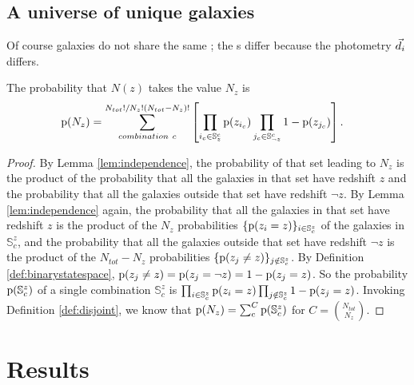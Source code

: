 \subsection{A universe of unique galaxies}

Of course galaxies do not share the same \pzpdf; the \pzpdf s differ because the photometry $\vec{d}_{i}$ differs.
\begin{lemma}\label{lem:unique}
	The probability that $N(z)$ takes the value $N_{z}$ is 
	\begin{align}
	\eqlabel{eqn:general}
	\pr{N_{z}} &= \sum_{combination\ c}^{N_{tot}! / N_{z}! (N_{tot} - N_{z})!} \left[ \prod_{i_{c} \in \mathbb{S}_{z}^{c}} \pr{z_{i_{c}}} \prod_{j_{c} \in \mathbb{S}_{\lnot z}^{c}} 1 - \pr{z_{j_{c}}} \right] .
	\end{align}
\end{lemma}
\begin{proof}
	By Lemma \ref{lem:independence}, the probability of that set leading to $N_{z}$ is the product of the probability that all the galaxies in that set have redshift $z$ and the probability that all the galaxies outside that set have redshift $\lnot z$.
	By Lemma \ref{lem:independence} again, the probability that all the galaxies in that set have redshift $z$ is the product of the $N_{z}$ probabilities $\{\mathrm{p}(z_{i} = z)\}_{i \in \mathbb{S}^{z}_{c}}$ of the galaxies in $\mathbb{S}^{z}_{c}$, and the probability that all the galaxies outside that set have redshift $\lnot z$ is the product of the $N_{tot} - N_{z}$ probabilities $\{\mathrm{p}(z_{j} \neq z)\}_{j \notin \mathbb{S}^{z}_{c}}$.
	By Definition \ref{def:binarystatespace}, $\mathrm{p}(z_{j} \neq z) = \mathrm{p}(z_{j} = \lnot z) = 1 - \mathrm{p}(z_{j} = z)$.
	So the probability $\mathrm{p}(\mathbb{S}^{z}_{c})$ of a single combination $\mathbb{S}^{z}_{c}$ is $\prod_{i \in \mathbb{S}^{z}_{c}} \mathrm{p}(z_{i} = z) \prod_{j \notin \mathbb{S}^{z}_{c}} 1 - \mathrm{p}(z_{j} = z)$.
	Invoking Definition \ref{def:disjoint}, we know that $\mathrm{p}(N_{z}) = \sum_{c}^{C} \mathrm{p}(\mathbb{S}^{z}_{c})$ for $C = \binom{N_{tot}}{N_{z}}$.
\end{proof}

\section{Results}


